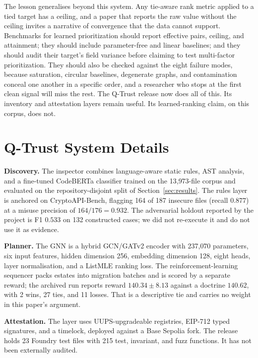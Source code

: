\documentclass[journal,10pt]{IEEEtran}
\begin{document}
The lesson generalises beyond this system. Any tie-aware rank metric applied to a tied target has a
ceiling, and a paper that reports the raw value without the ceiling invites a narrative of
convergence that the data cannot support. Benchmarks for learned prioritization should report
effective pairs, ceiling, and attainment; they should include parameter-free and linear baselines;
and they should audit their target's field variance before claiming to test multi-factor
prioritization. They should also be checked against the eight failure modes, because saturation,
circular baselines, degenerate graphs, and contamination conceal one another in a specific order,
and a researcher who stops at the first clean signal will miss the rest. The Q-Trust release now
does all of this. Its inventory and attestation layers remain useful. Its learned-ranking claim, on
this corpus, does not.

\appendices

\section{Q-Trust System Details}
\label{app:system}

\textbf{Discovery.} The inspector combines language-aware static rules, AST analysis, and a
fine-tuned CodeBERTa classifier trained on the 13{,}973-file corpus and evaluated on the
repository-disjoint split of Section~\ref{sec:results}. The rules layer is anchored on
CryptoAPI-Bench, flagging 164 of 187 insecure files (recall $0.877$) at a misuse precision of
$164/176=0.932$. The adversarial holdout reported by the project is F1 $0.533$ on 132 constructed
cases; we did not re-execute it and do not use it as evidence.

\textbf{Planner.} The GNN is a hybrid GCN/GATv2 encoder with 237{,}070 parameters, six input
features, hidden dimension 256, embedding dimension 128, eight heads, layer normalisation, and a
ListMLE ranking loss. The reinforcement-learning sequencer packs estates into migration batches and
is scored by a separate reward; the archived run reports reward $140.34\pm8.13$ against a doctrine
$140.62$, with 2 wins, 27 ties, and 11 losses. That is a descriptive tie and carries no weight in
this paper's argument.

\textbf{Attestation.} The layer uses UUPS-upgradeable registries, EIP-712 typed signatures, and a
timelock, deployed against a Base Sepolia fork. The release holds 23 Foundry test files with 215
test, invariant, and fuzz functions. It has not been externally audited.
\end{document}
